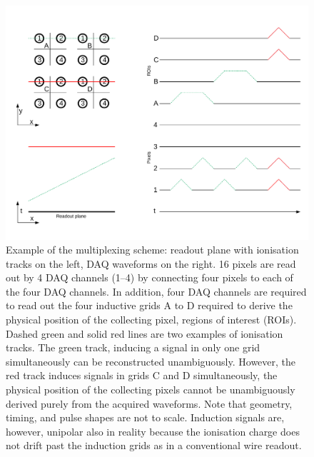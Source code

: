 \documentclass[instruments,article,submit,moreauthors,pdftex]{Definitions/mdpi}
\begin{document}
\begin{figure}[htb]
	\centering
	\includegraphics[width=\textwidth]{Figures/mux}
	\caption{Example of the multiplexing scheme: readout plane with ionisation tracks on the left, DAQ waveforms on the right. 16 pixels are read out by 4 DAQ channels (\numrange{1}{4}) by connecting four pixels to each of the four DAQ channels. In addition, four DAQ channels are required to read out the four inductive grids A to D required to derive the physical position of the collecting pixel, regions of interest (ROIs). Dashed green and solid red lines are two examples of ionisation tracks. The green track, inducing a signal in only one grid simultaneously can be reconstructed unambiguously. However, the red track induces signals in grids C and D simultaneously, the physical position of the collecting pixels cannot be unambiguously derived purely from the acquired waveforms. Note that geometry, timing, and pulse shapes are not to scale. Induction signals are, however, unipolar also in reality because the ionisation charge does not drift past the induction grids as in a conventional wire readout.}
	\label{fig:mux}
\end{figure}
\end{document}
